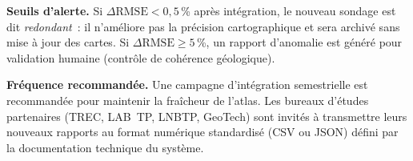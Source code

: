 \documentclass[10pt,a4paper,twocolumn]{article}
\begin{document}
	\bigskip
	\noindent
	\textbf{Seuils d'alerte.}
	Si $\Delta\mathrm{RMSE} < 0{,}5$\,\% après intégration, le
	nouveau sondage est dit \emph{redondant}~: il n'améliore pas
	la précision cartographique et sera archivé sans mise à jour
	des cartes. Si $\Delta\mathrm{RMSE} \geq 5$\,\%, un rapport
	d'anomalie est généré pour validation humaine
	(contrôle de cohérence géologique).

	\bigskip
	\noindent
	\textbf{Fréquence recommandée.}
	Une campagne d'intégration semestrielle est recommandée pour
	maintenir la fraîcheur de l'atlas. Les bureaux d'études partenaires
	(TREC, LAB~TP, LNBTP, GeoTech) sont invités à transmettre leurs
	nouveaux rapports au format numérique standardisé (CSV ou JSON)
	défini par la documentation technique du système.
\end{document}
